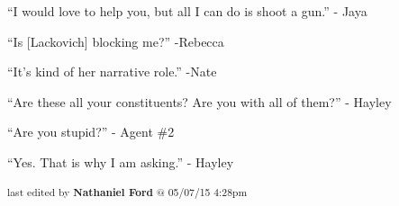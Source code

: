 ``I would love to help you, but all I can do is shoot a gun.'' - Jaya



``Is {[}Lackovich{]} blocking me?'' -Rebecca 

``It's kind of her narrative role.'' -Nate



``Are these all your constituents?  Are you with all of them?'' - Hayley

``Are you stupid?'' - Agent \#2

``Yes.  That is why I am asking.'' - Hayley




\iffalse

======================
THESE ARE ERRORS ENCOUNTERED DURING THE EXPORT PROCESS
======================

	Unable to highlight for footnote: The Orc grabbed his BDU collar and pulled him close before saying, "Are you sure?" Then Oliver was slammed into the wall before the Orc took off. because:GivenExpectedThe Orc grabs Oliver’s collar and leans in closeThe Orc leans in close to Oliver


\fi

\vspace{\fill}

\begin{flushright}
\textsubscript{last edited by \textbf{Nathaniel Ford} @ 05/07/15 4:28pm}
\end{flushright}

